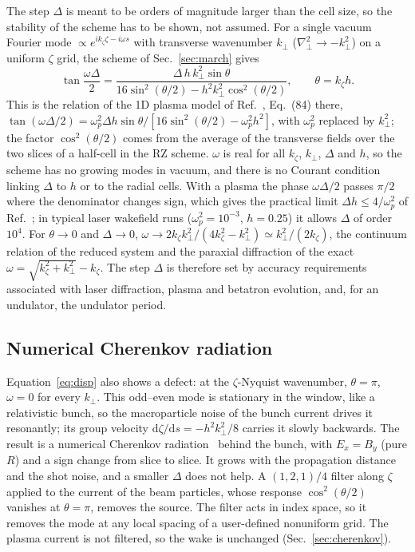 \documentclass[preprint,12pt]{elsarticle}
\newcommand{\dd}{\mathrm{d}}
\begin{document}
The step $\Delta$ is meant to be orders of magnitude larger than the cell size, so the stability of the scheme has to be shown, not assumed. For a single vacuum Fourier mode $\propto e^{ik_\zeta\zeta - i\omega s}$ with transverse wavenumber $k_\perp$ ($\nabla_\perp^2 \to -k_\perp^2$) on a uniform $\zeta$ grid, the scheme of Sec.~\ref{sec:march} gives
\begin{equation}
\tan\frac{\omega\Delta}{2} = \frac{\Delta\, h\, k_\perp^2 \sin\theta}{16\sin^2(\theta/2) - h^2 k_\perp^2\cos^2(\theta/2)}, \qquad \theta = k_\zeta h. \label{eq:disp}
\end{equation}
This is the relation of the 1D plasma model of Ref.~\cite{GEMPIC}, Eq.~(84) there, $\tan(\omega\Delta/2) = \omega_p^2\Delta h\sin\theta/[16\sin^2(\theta/2) - \omega_p^2h^2]$, with $\omega_p^2$ replaced by $k_\perp^2$; the factor $\cos^2(\theta/2)$ comes from the average of the transverse fields over the two slices of a half-cell in the RZ scheme. $\omega$ is real for all $k_\zeta$, $k_\perp$, $\Delta$ and $h$, so the scheme has no growing modes in vacuum, and there is no Courant condition linking $\Delta$ to $h$ or to the radial cells. With a plasma the phase $\omega\Delta/2$ passes $\pi/2$ where the denominator changes sign, which gives the practical limit $\Delta h \le 4/\omega_p^2$ of Ref.~\cite{GEMPIC}; in typical laser wakefield runs ($\omega_p^2 = 10^{-3}$, $h = 0.25$) it allows $\Delta$ of order $10^4$. For $\theta \to 0$ and $\Delta \to 0$, $\omega \to 2k_\zeta k_\perp^2/(4k_\zeta^2 - k_\perp^2) \simeq k_\perp^2/(2k_\zeta)$, the continuum relation of the reduced system and the paraxial diffraction of the exact $\omega = \sqrt{k_\zeta^2 + k_\perp^2} - k_\zeta$. The step $\Delta$ is therefore set by accuracy requirements associated with laser diffraction, plasma and betatron evolution, and, for an undulator, the undulator period.

\subsection{Numerical Cherenkov radiation}\label{sec:cherenkovtheory}

Equation~\eqref{eq:disp} also shows a defect: at the $\zeta$-Nyquist wavenumber, $\theta = \pi$, $\omega = 0$ for every $k_\perp$. This odd--even mode is stationary in the window, like a relativistic bunch, so the macroparticle noise of the bunch current drives it resonantly; its group velocity $\dd\zeta/\dd s = -h^2k_\perp^2/8$ carries it slowly backwards. The result is a numerical Cherenkov radiation~\cite{Godfrey1974} behind the bunch, with $E_x = B_y$ (pure $R$) and a sign change from slice to slice. It grows with the propagation distance and the shot noise, and a smaller $\Delta$ does not help. A $(1,2,1)/4$ filter along $\zeta$ applied to the current of the beam particles, whose response $\cos^2(\theta/2)$ vanishes at $\theta = \pi$, removes the source. The filter acts in index space, so it removes the mode at any local spacing of a user-defined nonuniform grid. The plasma current is not filtered, so the wake is unchanged (Sec.~\ref{sec:cherenkov}).
\end{document}
